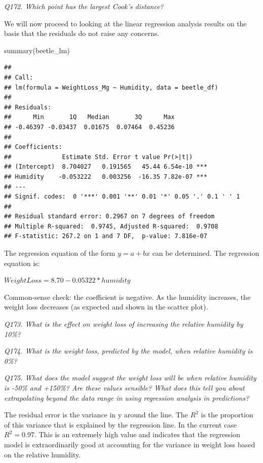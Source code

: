 \documentclass[
  11pt,
  a4paper,
]{book}
\newenvironment{Shaded}{\begin{snugshade}}{\end{snugshade}}
\newcommand{\FunctionTok}[1]{\textcolor[rgb]{0.00,0.00,0.00}{#1}}
\newcommand{\NormalTok}[1]{#1}
\begin{document}
\emph{Q172. Which point has the largest Cook's distance?}

We will now proceed to looking at the linear regression analysis results on the basis that the residuals do not raise any concerns.

\begin{Shaded}
\begin{Highlighting}[]
\FunctionTok{summary}\NormalTok{(beetle\_lm)}
\end{Highlighting}
\end{Shaded}

\begin{verbatim}
## 
## Call:
## lm(formula = WeightLoss_Mg ~ Humidity, data = beetle_df)
## 
## Residuals:
##      Min       1Q   Median       3Q      Max 
## -0.46397 -0.03437  0.01675  0.07464  0.45236 
## 
## Coefficients:
##              Estimate Std. Error t value Pr(>|t|)    
## (Intercept)  8.704027   0.191565   45.44 6.54e-10 ***
## Humidity    -0.053222   0.003256  -16.35 7.82e-07 ***
## ---
## Signif. codes:  0 '***' 0.001 '**' 0.01 '*' 0.05 '.' 0.1 ' ' 1
## 
## Residual standard error: 0.2967 on 7 degrees of freedom
## Multiple R-squared:  0.9745, Adjusted R-squared:  0.9708 
## F-statistic: 267.2 on 1 and 7 DF,  p-value: 7.816e-07
\end{verbatim}

The regression equation of the form \(y = a + bx\) can be determined. The regression equation is:

\(WeightLoss = 8.70 - 0.05322 * humidity\)

Common-sense check: the coefficient is negative. As the humidity increases, the weight loss decreases (as expected and shown in the scatter plot).

\emph{Q173. What is the effect on weight loss of increasing the relative humidity by 10\%?}

\emph{Q174. What is the weight loss, predicted by the model, when relative humidity is 0\%?}

\emph{Q175. What does the model suggest the weight loss will be when relative humidity is -50\% and +150\%? Are these values sensible? What does this tell you about extrapolating beyond the data range in using regression analysis in predictions?}

The residual error is the variance in y around the line. The \(R^2\) is the proportion of this variance that is explained by the regression line. In the current case \(R^2 = 0.97\). This is an extremely high value and indicates that the regression model is extraordinarily good at accounting for the variance in weight loss based on the relative humidity.
\end{document}

